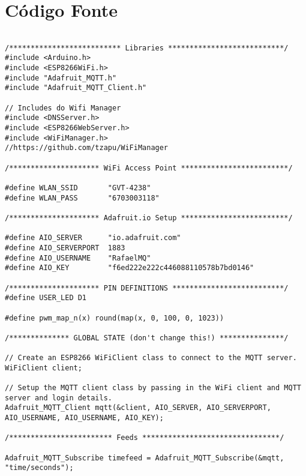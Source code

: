\chapter{Código Fonte}


\begin{lstlisting}

/************************** Libraries ***************************/
#include <Arduino.h>
#include <ESP8266WiFi.h>
#include "Adafruit_MQTT.h"
#include "Adafruit_MQTT_Client.h"

// Includes do Wifi Manager
#include <DNSServer.h>
#include <ESP8266WebServer.h>
#include <WiFiManager.h>         //https://github.com/tzapu/WiFiManager

/********************* WiFi Access Point *************************/

#define WLAN_SSID       "GVT-4238"
#define WLAN_PASS       "6703003118"

/********************* Adafruit.io Setup *************************/

#define AIO_SERVER      "io.adafruit.com"
#define AIO_SERVERPORT  1883
#define AIO_USERNAME    "RafaelMQ"
#define AIO_KEY         "f6ed222e222c446088110578b7bd0146"

/********************* PIN DEFINITIONS **************************/
#define USER_LED D1

#define pwm_map_n(x) round(map(x, 0, 100, 0, 1023))

/************** GLOBAL STATE (don't change this!) ***************/

// Create an ESP8266 WiFiClient class to connect to the MQTT server.
WiFiClient client;

// Setup the MQTT client class by passing in the WiFi client and MQTT server and login details.
Adafruit_MQTT_Client mqtt(&client, AIO_SERVER, AIO_SERVERPORT, AIO_USERNAME, AIO_USERNAME, AIO_KEY);

/************************ Feeds ********************************/

Adafruit_MQTT_Subscribe timefeed = Adafruit_MQTT_Subscribe(&mqtt, "time/seconds");


\end{lstlisting}
